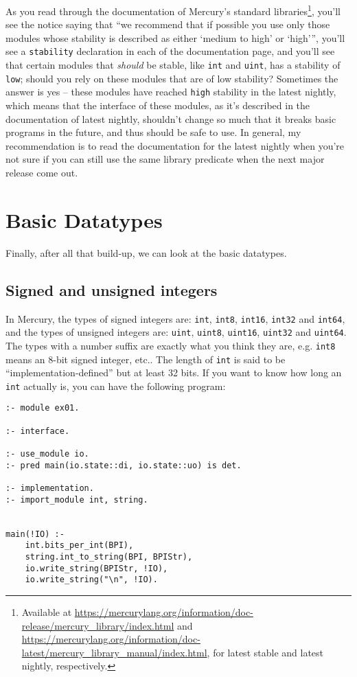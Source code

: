 As you read through the documentation of Mercury's standard libraries\footnote{Available at \url{https://mercurylang.org/information/doc-release/mercury_library/index.html} and \url{https://mercurylang.org/information/doc-latest/mercury_library_manual/index.html}, for latest stable and latest nightly, respectively.}, you'll see the notice saying that ``we recommend that if possible you use only those modules whose stability is described as either `medium to high' or `high''', you'll see a \texttt{stability} declaration in each of the documentation page, and you'll see that certain modules that \textit{should} be stable, like \texttt{int} and \texttt{uint}, has a stability of \texttt{low}; should you rely on these modules that are of low stability? Sometimes the answer is yes -- these modules have reached \texttt{high} stability in the latest nightly, which means that the interface of these modules, as it's described in the documentation of latest nightly, shouldn't change so much that it breaks basic programs in the future, and thus should be safe to use. In general, my recommendation is to read the documentation for the latest nightly when you're not sure if you can still use the same library predicate when the next major release come out.

\section{Basic Datatypes}

Finally, after all that build-up, we can look at the basic datatypes.

\subsection{Signed and unsigned integers}

In Mercury, the types of signed integers are: \texttt{int}, \texttt{int8}, \texttt{int16}, \texttt{int32} and \texttt{int64}, and the types of unsigned integers are: \texttt{uint}, \texttt{uint8}, \texttt{uint16}, \texttt{uint32} and \texttt{uint64}. The types with a number suffix are exactly what you think they are, e.g. \texttt{int8} means an 8-bit signed integer, etc.. The length of \texttt{int} is said to be ``implementation-defined'' but at least 32 bits. If you want to know how long an \texttt{int} actually is, you can have the following program:

\begin{lstlisting}[language=Mercury]
:- module ex01.

:- interface.

:- use_module io.
:- pred main(io.state::di, io.state::uo) is det.

:- implementation.
:- import_module int, string.


main(!IO) :-
    int.bits_per_int(BPI),
	string.int_to_string(BPI, BPIStr),
	io.write_string(BPIStr, !IO),
	io.write_string("\n", !IO).
\end{lstlisting}


